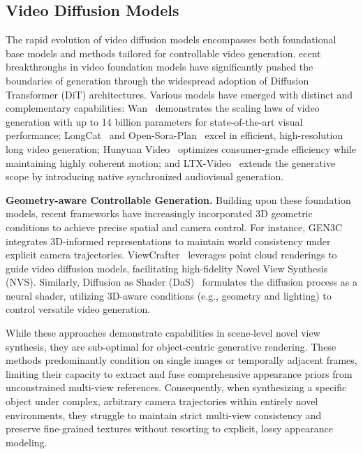 \documentclass[runningheads]{llncs}
\begin{document}
\subsection{Video Diffusion Models}
The rapid evolution of video diffusion models encompasses both foundational base models and methods tailored for controllable video generation.
ecent breakthroughs in video foundation models have significantly pushed the boundaries of generation through the widespread adoption of Diffusion Transformer (DiT) architectures. Various models have emerged with distinct and complementary capabilities: Wan~\cite{wan} demonstrates the scaling laws of video generation with up to 14 billion parameters for state-of-the-art visual performance; LongCat~\cite{longcat} and Open-Sora-Plan~\cite{opensoraplan} excel in efficient, high-resolution long video generation; Hunyuan Video~\cite{hunyuanvideo} optimizes consumer-grade efficiency while maintaining highly coherent motion; and LTX-Video~\cite{ltx2} extends the generative scope by introducing native synchronized audiovisual generation.

\textbf{Geometry-aware Controllable Generation.} Building upon these foundation models, recent frameworks have increasingly incorporated 3D geometric conditions to achieve precise spatial and camera control. For instance, GEN3C~\cite{gen3c} integrates 3D-informed representations to maintain world consistency under explicit camera trajectories. ViewCrafter~\cite{viewcrafter} leverages point cloud renderings to guide video diffusion models, facilitating high-fidelity Novel View Synthesis (NVS). Similarly, Diffusion as Shader (DaS)~\cite{das} formulates the diffusion process as a neural shader, utilizing 3D-aware conditions (e.g., geometry and lighting) to control versatile video generation. 

While these approaches demonstrate capabilities in scene-level novel view synthesis, they are sub-optimal for object-centric generative rendering. These methods predominantly condition on single images or temporally adjacent frames, limiting their capacity to extract and fuse comprehensive appearance priors from unconstrained multi-view references. Consequently, when synthesizing a specific object under complex, arbitrary camera trajectories within entirely novel environments, they struggle to maintain strict multi-view consistency and preserve fine-grained textures without resorting to explicit, lossy appearance modeling.
\end{document}
